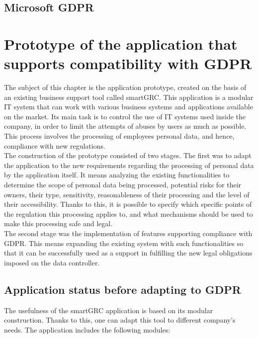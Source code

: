 \documentclass[en, noamssymb]{mgr}
\begin{document}
\section{Microsoft GDPR}



\chapter{Prototype of the application that supports compatibility with GDPR}\label{sec:sekcjaOpisPrototypu}

The subject of this chapter is the application prototype, created on the basis of an existing business support tool called smartGRC. This application is a modular IT system that can work with various business systems and applications available on the market. Its main task is to control the use of IT systems used inside the company, in order to limit the attempts of abuses by users as much as possible. This process involves the processing of employees personal data, and hence, compliance with new regulations.\\
\indent The construction of the prototype consisted of two stages. The first was to adapt the application to the new requirements regarding the processing of personal data by the application itself. It means analyzing the existing functionalities to determine the scope of personal data being processed, potential risks for their owners, their type, sensitivity, reasonableness of their processing and the level of their accessibility. Thanks to this, it is possible to specify which specific points of the regulation this processing applies to, and what mechanisms should be used to make this processing safe and legal.\\
\indent The second stage was the implementation of features supporting compliance with GDPR. This means expanding the existing system with such functionalities so that it can be successfully used as a support in fulfilling the new legal obligations imposed on the data controller.

\section{Application status before adapting to GDPR}

The usefulness of the smartGRC application is based on its modular construction. Thanks to this, one can adapt this tool to different company's needs. The application includes the following modules:
\end{document}
